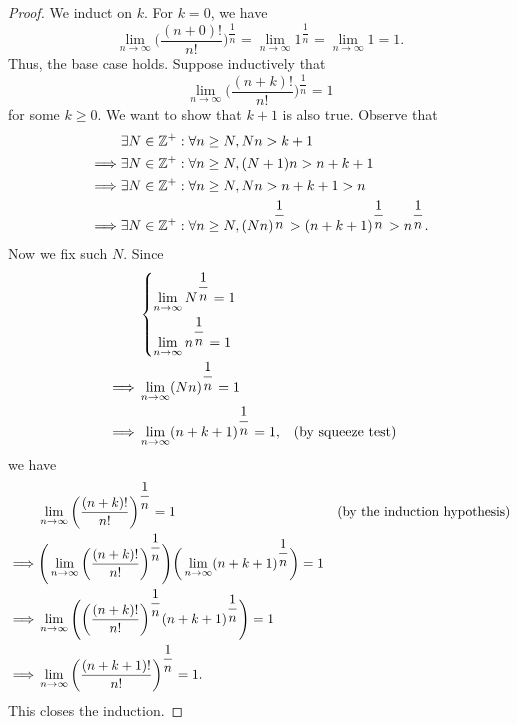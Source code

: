 \begin{proof}
  We induct on \(k\).
  For \(k = 0\), we have
  \[
    \lim_{n \to \infty} \bigg(\dfrac{(n + 0)!}{n!}\bigg)^{\dfrac{1}{n}} = \lim_{n \to \infty} 1^{\dfrac{1}{n}} = \lim_{n \to \infty} 1 = 1.
  \]
  Thus, the base case holds.
  Suppose inductively that
  \[
    \lim_{n \to \infty} \bigg(\dfrac{(n + k)!}{n!}\bigg)^{\dfrac{1}{n}} = 1
  \]
  for some \(k \geq 0\).
  We want to show that \(k + 1\) is also true.
  Observe that
  \begin{align*}
             & \exists N \in \mathbb{Z}^+ : \forall n \geq N, Nn > k + 1                                                           \\
    \implies & \exists N \in \mathbb{Z}^+ : \forall n \geq N, (N + 1)n > n + k + 1                                                 \\
    \implies & \exists N \in \mathbb{Z}^+ : \forall n \geq N, Nn > n + k + 1 > n                                                   \\
    \implies & \exists N \in \mathbb{Z}^+ : \forall n \geq N, (Nn)^{\dfrac{1}{n}} > (n + k + 1)^{\dfrac{1}{n}} > n^{\dfrac{1}{n}}.
  \end{align*}
  Now we fix such \(N\).
  Since
  \begin{align*}
             & \begin{dcases}
                 \lim_{n \to \infty} N^{\dfrac{1}{n}} = 1 \\ %
                 \lim_{n \to \infty} n^{\dfrac{1}{n}} = 1 %
               \end{dcases}                                \\
    \implies & \lim_{n \to \infty} (Nn)^{\dfrac{1}{n}} = 1                                                                             \\
    \implies & \lim_{n \to \infty} (n + k + 1)^{\dfrac{1}{n}} = 1,                                       &  & \text{(by squeeze test)}
  \end{align*}
  we have
  \begin{align*}
             & \lim_{n \to \infty} \bigg(\dfrac{(n + k)!}{n!}\bigg)^{\dfrac{1}{n}} = 1                                                                        &  & \text{(by the induction hypothesis)} \\
    \implies & \Bigg(\lim_{n \to \infty} \bigg(\dfrac{(n + k)!}{n!}\bigg)^{\dfrac{1}{n}}\Bigg) \bigg(\lim_{n \to \infty} (n + k + 1)^{\dfrac{1}{n}}\bigg) = 1            \\
    \implies & \lim_{n \to \infty} \Bigg(\bigg(\dfrac{(n + k)!}{n!}\bigg)^{\dfrac{1}{n}} (n + k + 1)^{\dfrac{1}{n}}\Bigg) = 1                                            \\
    \implies & \lim_{n \to \infty} \bigg(\dfrac{(n + k + 1)!}{n!}\bigg)^{\dfrac{1}{n}} = 1.
  \end{align*}
  This closes the induction.
\end{proof}

